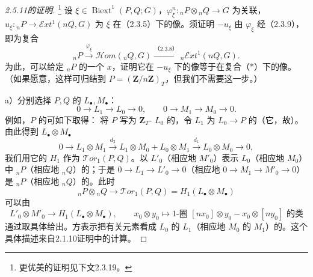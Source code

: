 \begin{proof}[2.5.11的证明]
\footnote{更优美的证明见下文2.3.19。}
设 $\xi\in\operatorname{Biext}^1(P,Q;G)$，$\varphi_\xi^n:{}_nP\otimes{}_nQ\longrightarrow G$ 为关联，$u_\xi:{}_nP\longrightarrow\mathcal Ext^1(nQ,G)$ 为 $\xi$ 在（2.3.5）下的像。须证明 $-u_\xi$ 由 $\varphi_\xi$ 经（2.3.9），即为复合
\[{}_nP\xrightarrow{\varphi_\xi}\mathcal Hom({}_nQ,G)
\xrightarrow{\text{（2.3.8）}}{}_n\mathcal Ext^1(nQ,G).\tag{*}\]
为此，可以给定 ${}_nP$ 的一个 $x$，证明它在 $-u_\xi$ 下的像等于在复合（*）下的像。（如果愿意，这样可归结到 $P=(\mathbf Z/n\mathbf Z)_T$，但我们不需要这一步。）

 a）分别选择 $P,Q$ 的 $L_\bullet,M_\bullet$：
\[0\longrightarrow L_1\longrightarrow L_0\longrightarrow0,\qquad
0\longrightarrow M_1\longrightarrow M_0\longrightarrow0.\]
例如，$P$ 的可如下取得：
将 $P$ 写为 $\mathbf Z_T$- $L_0$ 的，令 $L_1$ 为 $L_0\longrightarrow P$ 的（它，故）。由此得到 $L_\bullet\otimes M_\bullet$
\[0\longrightarrow L_1\otimes M_1\xrightarrow{d_2}
L_1\otimes M_0+L_0\otimes M_1\xrightarrow{d_1}L_0\otimes M_0\longrightarrow0,\]
我们用它的 $H_1$ 作为 $\mathcal Tor_1(P,Q)$。以 $L'_0$（相应地 $M'_0$）表示 $L_0$（相应地 $M_0$）中 ${}_nP$（相应地 ${}_nQ$）的；于是 $0\longrightarrow L_1\longrightarrow L'_0\longrightarrow0$（相应地 $0\longrightarrow M_1\longrightarrow M'_0\longrightarrow0$）是 ${}_nP$（相应地 ${}_nQ$）的。此时
\[{}_nP\otimes{}_nQ\longrightarrow\mathcal Tor_1(P,Q)=H_1(L_\bullet\otimes M_\bullet)\]
可以由
\[L'_0\otimes M'_0\longrightarrow H_1(L_\bullet\otimes M_\bullet),\qquad
x_0\otimes y_0\longmapsto\text{1-圈 }[nx_0]\otimes y_0-x_0\otimes[ny_0]\text{ 的类}\]
通过取具体给出。方表示把有关元素看成 $L_0$ 的 $L_1$（相应地 $M_0$ 的 $M_1$）的。这个具体描述来自2.1.10证明中的计算。


\end{proof}
